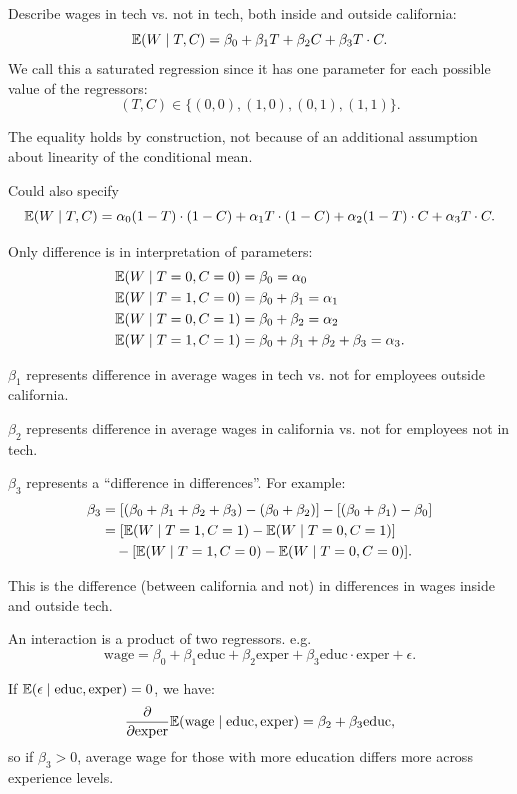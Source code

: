 \begin{remark}
	Describe wages in tech vs. not in tech, both inside and outside california: \[
		\mathbb{E}(W \mid T, C) = \beta_0 + \beta_1 T + \beta_2 C + \beta_3 T \cdot C
	.\] 
	We call this a saturated regression since it has one parameter for each possible value of the regressors: \[
		(T, C) \in \{(0,0), (1,0), (0,1), (1,1)\}
	.\] 
	
	The equality holds by construction, not because of an additional assumption about linearity of the conditional mean.
	
	Could also specify \[
		\mathbb{E}(W \mid T, C) = \alpha_0 (1-T) \cdot (1-C) + \alpha_1 T \cdot (1-C) + \alpha_2 (1-T) \cdot C + \alpha_3 T \cdot C
	.\] 
	
	Only difference is in interpretation of parameters: \begin{align*}
		\mathbb{E}(W \mid T = 0, C = 0) &= \beta_0 = \alpha_0 \\
		\mathbb{E}(W \mid T = 1, C = 0) &= \beta_0 + \beta_1 = \alpha_1 \\
		\mathbb{E}(W \mid T = 0, C = 1) &= \beta_0 + \beta_2 = \alpha_2 \\
		\mathbb{E}(W \mid T = 1, C = 1) &= \beta_0 + \beta_1 + \beta_2 + \beta_3 = \alpha_3
	.\end{align*}
	
	$\beta_1$ represents difference in average wages in tech vs. not for employees outside california.
	
	$\beta_2$ represents difference in average wages in california vs. not for employees not in tech.
	
	$\beta_3$ represents a ``difference in differences''. For example: \begin{align*}
		\beta_3 &= [(\beta_0 + \beta_1 + \beta_2 + \beta_3) - (\beta_0 + \beta_2)] - [(\beta_0 + \beta_1) - \beta_0] \\
		&= [\mathbb{E}(W \mid T = 1, C = 1) - \mathbb{E}(W \mid T = 0, C = 1)] \\
		&\quad - [\mathbb{E}(W \mid T = 1, C = 0) - \mathbb{E}(W \mid T = 0, C = 0)]
	.\end{align*}
	
	This is the difference (between california and not) in differences in wages inside and outside tech.
\end{remark}

	\begin{remark}[Interactions]
		An interaction is a product of two regressors. e.g. \[
			\text{wage} = \beta_0 + \beta_1 \text{educ} + \beta_2 \text{exper} + \beta_3 \text{educ} \cdot \text{exper} + \epsilon
	.\] 
	
		If $\mathbb{E}(\epsilon \mid \text{educ}, \text{exper}) = 0$, we have: \[
			\frac{\partial}{\partial \text{exper}} \mathbb{E}(\text{wage} \mid \text{educ}, \text{exper}) = \beta_2 + \beta_3 \text{educ}
		,\] so if $\beta_3 > 0$, average wage for those with more education differs more across experience levels.
	\end{remark}

